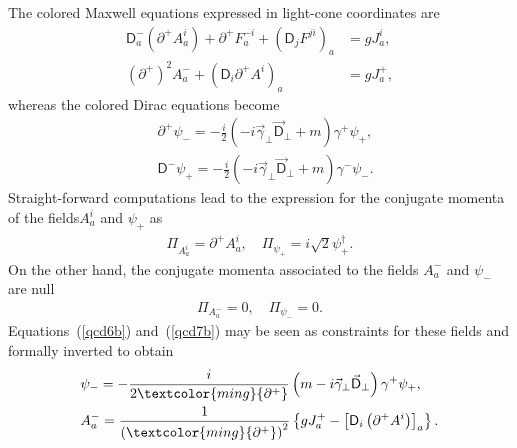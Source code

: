 The colored Maxwell equations expressed in light-cone coordinates are
\begin{subequations}
\begin{align}
    \textsf{D}^-_a\left(\partial^+A_a^i\right)+\partial^+F^{-i}_a+\left(\textsf{D}_jF^{ji}\right)_a&=gJ_a^i,\label{qcd6a}\\
\left(\partial^+\right)^2A_a^-+\left(\textsf{D}_i\partial^+A^i\right)_a&=gJ^+_a,\label{qcd6b}
\end{align}
\end{subequations}
whereas the colored Dirac equations become
\begin{subequations}
\begin{align}
    &\partial^+\psi_-=-\frac{i}{2}\left(-i\vec{\gamma}_\perp\vec{\textsf{D}}_\perp+m\right)\gamma^+\psi_+,\label{qcd7a}\\ 
&\textsf{D}^-\psi_+=-\frac{i}{2}\left(-i\vec{\gamma}_\perp\vec{\textsf{D}}_\perp+m\right)\gamma^-\psi_-.\label{qcd7b}
\end{align}
\end{subequations}
Straight-forward computations lead to the expression for the conjugate momenta of the fields$A_a^i$ and $\psi_+$ as
\begin{align*}
    \Pi_{A_a^i}=\partial^+A_a^i, \quad \Pi_{\psi_+}=i\sqrt{2}\psi_+^\dag.
\end{align*}
On the other hand, the conjugate momenta associated to the fields $A_a^-$ and $\psi_-$ are null
\begin{align*}
    \Pi_{A_a^-}=0,\quad \Pi_{\psi_-}=0.
\end{align*}
Equations~(\cref{qcd6b}) and~(\cref{qcd7b}) may be seen as constraints for these fields and formally inverted to obtain
\begin{align*}
    &\psi_-=-\frac{i}{2\textcolor{ming}{\partial^+}}\left(m-i\vec{\gamma}_\perp\vec{\textsf{D}}_\perp\right)\gamma^+\psi_+,\\
&A_a^-=\frac{1}{\left(\textcolor{ming}{\partial^+}\right)^2}\left\lbrace gJ_a^+-\left[\textsf{D}_i\left(\partial^+A^i\right)\right]_a\right\rbrace.
\end{align*}
